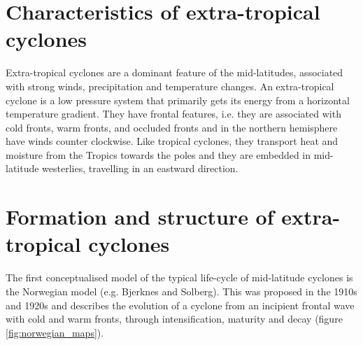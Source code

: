 


\section{Characteristics of extra-tropical cyclones}

%
Extra-tropical cyclones are a dominant feature of the mid-latitudes, associated with strong winds, precipitation and temperature changes. An extra-tropical cyclone is a low pressure system that primarily gets its energy from a horizontal temperature gradient. They have frontal features, i.e. they are associated with cold fronts, warm fronts, and occluded fronts and in the northern hemisphere have winds counter clockwise. Like tropical cyclones, they transport heat and moisture from the Tropics towards the poles and they are embedded in mid-latitude westerlies, travelling in an eastward direction.


\section {Formation and structure of extra-tropical cyclones}
%

The first conceptualised model of the typical life-cycle of mid-latitude cyclones is the Norwegian model (e.g. Bjerknes and Solberg). This was proposed in the 1910s and 1920s and describes the evolution of a cyclone from an incipient frontal wave with cold and warm fronts, through intensification, maturity and decay (figure \ref {fig:norwegian_maps}).

